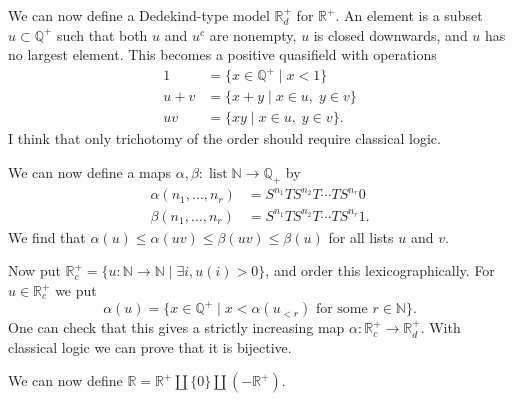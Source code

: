 \documentclass{amsart}
\newcommand{\lst}	{\operatorname{list}}
\newcommand{\N}         {{\mathbb{N}}}
\newcommand{\Q}         {{\mathbb{Q}}}
\newcommand{\R}         {{\mathbb{R}}}
\newcommand{\al}        {\alpha}
\newcommand{\bt}        {\beta}
\newcommand{\st}        {\;|\;}
\renewcommand{\:}{\colon}
\theoremstyle{definition}
\begin{document}
We can now define a Dedekind-type model $\R^+_d$ for $\R^+$.  An
element is a subset $u\subset\Q^+$ such that both $u$ and $u^c$ are
nonempty, $u$ is closed downwards, and $u$ has no largest element.
This becomes a positive quasifield with operations
\begin{align*}
 1   &= \{x\in\Q^+\st x<1\} \\
 u+v &= \{x+y\st x\in u,\;y\in v\} \\
 uv  &= \{xy\st x\in u,\;y\in v\}.
\end{align*}
I think that only trichotomy of the order should require classical
logic.  

We can now define a maps $\al,\bt\:\lst\N\to\Q_+$ by 
\begin{align*}
 \al(n_1,\dotsc,n_r) &= S^{n_1}TS^{n_2}T\dotsb TS^{n_r}0 \\
 \bt(n_1,\dotsc,n_r) &= S^{n_1}TS^{n_2}T\dotsb TS^{n_r}1.
\end{align*}
We find that $\al(u)\leq\al(uv)\leq\bt(uv)\leq\bt(u)$ for all lists
$u$ and $v$.  

Now put $\R^+_c=\{u\:\N\to\N\st \exists i, u(i)>0\}$, and order this
lexicographically.  For $u\in\R^+_c$ we put 
\[ \al(u) = \{x\in\Q^+ \st x<\al(u_{<r}) \text{ for some } r\in\N\}.
\]
One can check that this gives a strictly increasing map
$\al\:\R^+_c\to\R^+_d$.  With classical logic we can prove that it is
bijective.  

We can now define $\R=\R^+\amalg\{0\}\amalg(-\R^+)$.
\end{document}
